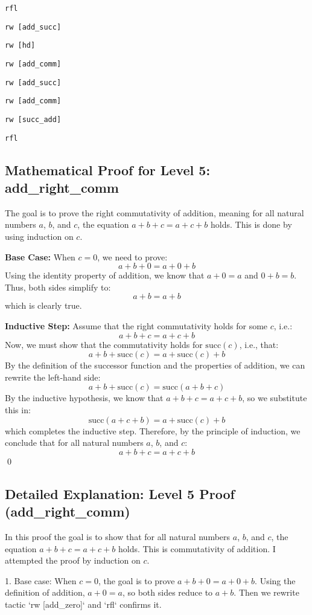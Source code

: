 \documentclass{article}
\begin{document}
\texttt{rfl}

\texttt{rw [add\_succ]}

\texttt{rw [hd]}

\texttt{rw [add\_comm]}

\texttt{rw [add\_succ]}

\texttt{rw [add\_comm]}

\texttt{rw [succ\_add]}

\texttt{rfl}

\subsection*{Mathematical Proof for Level 5: add\_right\_comm}
The goal is to prove the right commutativity of addition, meaning for all natural numbers \(a\), \(b\), and \(c\), the equation \(a + b + c = a + c + b\) holds. This is done by using induction on \(c\).

\textbf{Base Case:} When \(c = 0\), we need to prove:
\[
a + b + 0 = a + 0 + b
\]
Using the identity property of addition, we know that \(a + 0 = a\) and \(0 + b = b\). Thus, both sides simplify to:
\[
a + b = a + b
\]
which is clearly true.

\textbf{Inductive Step:} Assume that the right commutativity holds for some \(c\), i.e.:
\[
a + b + c = a + c + b
\]
Now, we must show that the commutativity holds for \(\text{succ}(c)\), i.e., that:
\[
a + b + \text{succ}(c) = a + \text{succ}(c) + b
\]
By the definition of the successor function and the properties of addition, we can rewrite the left-hand side:
\[
a + b + \text{succ}(c) = \text{succ}(a + b + c)
\]
By the inductive hypothesis, we know that \(a + b + c = a + c + b\), so we substitute this in:
\[
\text{succ}(a + c + b) = a + \text{succ}(c) + b
\]
which completes the inductive step. Therefore, by the principle of induction, we conclude that for all natural numbers \(a\), \(b\), and \(c\):
\[
a + b + c = a + c + b
\]
\qed

\subsection*{Detailed Explanation: Level 5 Proof (add\_right\_comm)}
In this proof the goal is to show that for all natural numbers \(a\), \(b\), and \(c\), the equation \(a + b + c = a + c + b\) holds. This is commutativity of addition. I attempted the proof by induction on \(c\).

1. Base case: When \(c = 0\), the goal is to prove \(a + b + 0 = a + 0 + b\). Using the definition of addition, \(a + 0 = a\), so both sides reduce to \(a + b\). Then we rewrite tactic `rw [add\_zero]` and `rfl` confirms it.
  
\end{document}
